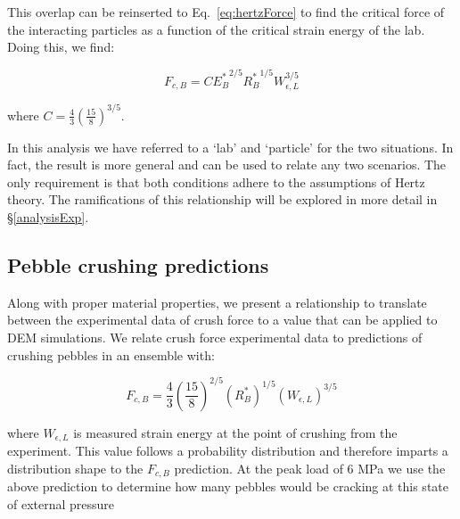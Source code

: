 This overlap can be reinserted to Eq.~\ref{eq:hertzForce} to find the critical force of the interacting particles as a function of the critical strain energy of the lab. Doing this, we find:

\begin{equation}\label{eq:peb_hertz}
	F_{c,B} = C{E_B^*}^{2/5}{R_B^*}^{1/5}W_{\epsilon,L}^{3/5}
\end{equation}

where $C = \frac{4}{3}\left(\frac{15}{8}\right)^{3/5}$.

In this analysis we have referred to a `lab' and `particle' for the two situations. In fact, the result is more general and can be used to relate any two scenarios. The only requirement is that both conditions adhere to the assumptions of Hertz theory. The ramifications of this relationship will be explored in more detail in \S\ref{analysisExp}.





\subsection{Pebble crushing predictions}
Along with proper material properties, we present a relationship to translate between the experimental data of crush force to a value that can be applied to DEM simulations. We relate crush force experimental data to predictions of crushing pebbles in an ensemble with:

\begin{equation}\label{eq:crush-predict}
  F_{c,B} = \frac{4}{3} \left(\frac{15}{8}\right)^{2/5}\left(R_B^* \right)^{1/5}\left( W_{\epsilon,L} \right)^{3/5}
\end{equation}

where $W_{\epsilon,L}$ is measured strain energy at the point of crushing from the experiment. This value follows a probability distribution and therefore imparts a distribution shape to the $F_{c,B}$ prediction. At the peak load of 6 MPa we use the above prediction to determine how many pebbles would be cracking at this state of external pressure